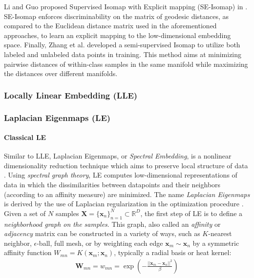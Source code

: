 Li and Guo proposed Supervised Isomap with Explicit mapping (SE-Isomap) in \citep{Li2006SupervisedIsomap}.  SE-Isomap enforces discriminability on the matrix of geodesic distances, as compared to the Euclidean distance matrix used in the aforementioned approaches, to learn an explicit mapping to the low-dimensional embedding space.  Finally, Zhang et al. \citep{Zhang2018IsomapMultiManifold} developed a semi-supervised Isomap to utilize both labeled and unlabeled data points in training.  This method aims at minimizing pairwise distances of within-class samples in the same manifold while maximizing the distances over different manifolds.

\subsubsection{Locally Linear Embedding (LLE)}

\subsubsection{Laplacian Eigenmaps (LE)}
\paragraph{Classical LE}
Similar to LLE, Laplacian Eigenmaps, or \textit{Spectral Embedding}, is a nonlinear dimensionality reduction technique which aims to preserve local structure of data \citep{Raducanu2012SupervisedNonlinearDimReduction,VanDerMaaten2009DRReview}.  Using \textit{spectral graph theory}, LE computes low-dimensional representations of data in which the dissimilarities between datapoints and their neighbors (according to an affinity measure) are minimized.  The name \textit{Laplacian Eigenmaps} is derived by the use of Laplacian regularization in the optimization procedure \citep{Thorstensen2009ManifoldThesis}. Given a set of $N$ samples $\bm{X} = \{\bm{x}_n\}^{N}_{n=1} \subset \mathbb{R}^{D}$, the first step of LE is to define a \textit{neighborhood graph on the samples}.  This graph, also called an \textit{affinity} or \textit{adjacency} matrix can be constructed in a variety of ways, such as $K$-nearest neighbor, $\epsilon$-ball, full mesh, or by weighting each edge $\bm{x}_m \sim \bm{x}_n$ by a symmetric affinity function $W_{mn} = K(\bm{x}_m;\bm{x}_n)$, typically a radial basis or heat kernel:
\begin{align}
	\bm{W}_{mn}= w_{mn} = \exp \left ( - \frac{|| \bm{x}_m - \bm{x}_n ||^{2}}{\beta}  \right )
\end{align}

